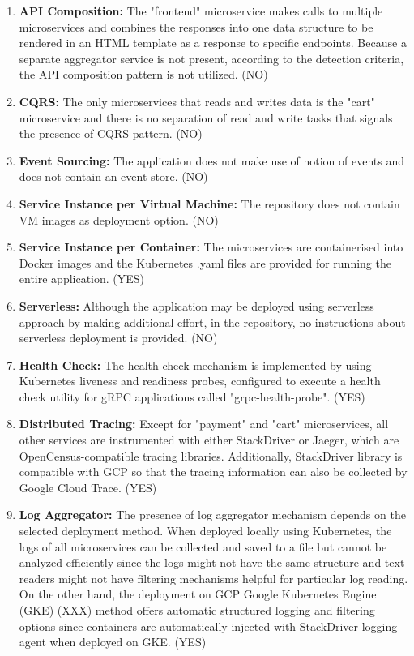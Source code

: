 \documentclass{Configuration_Files/PoliMi3i_thesis}
\begin{document}
\begin{enumerate}
    \item \textbf{API Composition:} The "frontend" microservice makes calls to multiple microservices and combines the responses into one data structure to be rendered in an HTML template as a response to specific endpoints.
    Because a separate aggregator service is not present, according to the detection criteria, the API composition pattern is not utilized. (NO)
    
    \item \textbf{CQRS:} The only microservices that reads and writes data is the "cart" microservice and there is no separation of read and write tasks that signals the presence of CQRS pattern. (NO)
    
    \item \textbf{Event Sourcing:} The application does not make use of notion of events and does not contain an event store. (NO)
    
    \item \textbf{Service Instance per Virtual Machine:} The repository does not contain VM images as deployment option. (NO)
    
    \item \textbf{Service Instance per Container:} The microservices are containerised into Docker images and the Kubernetes .yaml files are provided for running the entire application. (YES)
    
    \item \textbf{Serverless:} Although the application may be deployed using serverless approach by making additional effort, in the repository, no instructions about serverless deployment is provided. (NO)
    
    \item \textbf{Health Check:} The health check mechanism is implemented by using Kubernetes liveness and readiness probes, configured to execute a health check utility for gRPC applications called "grpc-health-probe". (YES)
    
    \item \textbf{Distributed Tracing:} Except for "payment" and "cart" microservices, all other services are instrumented with either StackDriver or Jaeger, which are OpenCensus-compatible tracing libraries.
    Additionally, StackDriver library is compatible with GCP so that the tracing information can also be collected by Google Cloud Trace. (YES)
    
    \item \textbf{Log Aggregator:} The presence of log aggregator mechanism depends on the selected deployment method.
    When deployed locally using Kubernetes, the logs of all microservices can be collected and saved to a file but cannot be analyzed efficiently since the logs might not have the same structure and text readers might not have filtering mechanisms helpful for particular log reading.
    On the other hand, the deployment on GCP Google Kubernetes Engine (GKE) (XXX) method offers automatic structured logging and filtering options since containers are automatically injected with StackDriver logging agent when deployed on GKE. (YES)
    

\end{enumerate}
\end{document}

